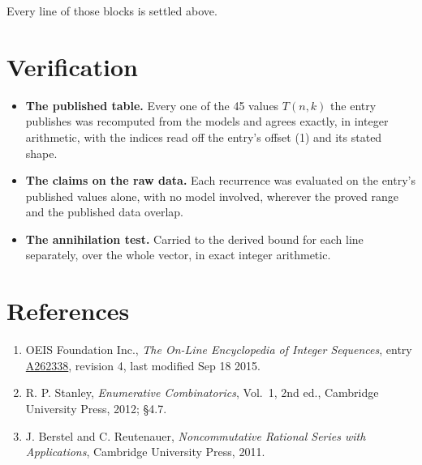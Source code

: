 \documentclass[11pt]{article}
\theoremstyle{definition}
\begin{document}
Every line of those blocks is settled above.

\section{Verification}

\begin{itemize}

\item {\bfseries The published table.} Every one of the 45 values $T(n,k)$ the entry publishes was recomputed from the models and agrees exactly, in integer arithmetic, with the indices read off the entry's offset (1) and its stated shape.

\item {\bfseries The claims on the raw data.} Each recurrence was evaluated on the entry's published values alone, with no model involved, wherever the proved range and the published data overlap.

\item {\bfseries The annihilation test.} Carried to the derived bound for each line separately, over the whole vector, in exact integer arithmetic.

\end{itemize}

\section{References}

\begin{enumerate}

\item OEIS Foundation Inc., \emph{The On-Line Encyclopedia of Integer Sequences}, entry \href{https://oeis.org/A262338}{A262338}, revision 4, last modified Sep 18 2015.

\item R. P. Stanley, \emph{Enumerative Combinatorics}, Vol.~1, 2nd ed., Cambridge University Press, 2012; \S4.7.

\item J. Berstel and C. Reutenauer, \emph{Noncommutative Rational Series with Applications}, Cambridge University Press, 2011.

\end{enumerate}
\end{document}
